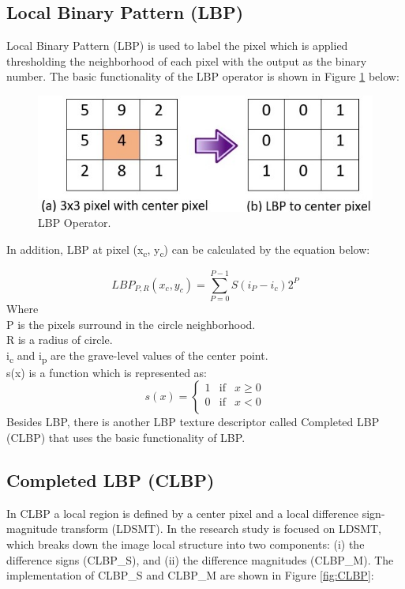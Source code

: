 \documentclass[review]{elsarticle}
\begin{document}
\subsection{Local Binary Pattern (LBP)}
\label{subsec:LBP}
Local Binary Pattern (LBP) \cite{Ojala1996} is used to label the pixel which is applied thresholding the neighborhood of each pixel with the output as the binary number. The basic functionality of the LBP operator is shown in Figure \ref{fig:LBP} below:

\begin{figure}[h]
	\centering
	\includegraphics[width=0.6\linewidth]{pic/fig2}
	\caption{LBP Operator.}
	\label{fig:LBP}
\end{figure}
In addition, LBP at pixel (x\textsubscript{c}, y\textsubscript{c}) can be calculated by the equation below:

\begin{equation}
LBP_{P,R} (x_c,y_c) = \sum_{P=0}^{P-1} S(i_P - i_c)2^P
\end{equation}
Where \\ 
P is the pixels surround in the circle neighborhood. \\
R is a radius of circle. \\
i\textsubscript{c}  and i\textsubscript{p}  are the grave-level values of the center point. \\
s(x) is a function which is represented as: \\
\begin{equation}
s(x) = \left\{ \begin{array}{rcl}
1 & \mbox{if}
& x\geq0 \\ 0 & \mbox{if} & x <0 \\

\end{array}\right.
\end{equation}
Besides LBP, there is another LBP texture descriptor called Completed LBP (CLBP) that uses the basic functionality of LBP.

\subsection{Completed LBP (CLBP)}
\label{subsec:CLBP}
In CLBP \cite{Guo2010} a local region is defined by a center pixel and a local difference sign-magnitude transform (LDSMT). In the research study is focused on LDSMT, which breaks down the image local structure into two components: (i) the difference signs (CLBP\_S), and (ii) the difference magnitudes (CLBP\_M). The implementation of CLBP\_S and CLBP\_M are shown in Figure \ref{fig:CLBP}: 
\end{document}
